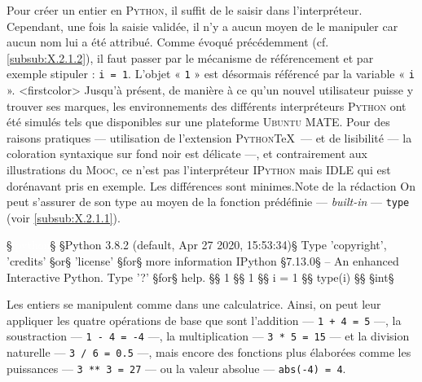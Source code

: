 

Pour créer un entier en \textsc{Python}, il suffit de le saisir dans l'interpréteur. Cependant, une fois la saisie validée, il n'y a aucun moyen de le manipuler car aucun nom lui a été attribué. Comme évoqué précédemment (cf. \cref{subsub:X.2.1.2}), il faut passer par le mécanisme de référencement et par exemple stipuler : \texttt{i = 1}. 
L'objet « \texttt{1} » est désormais référencé par la variable « \texttt{i} ».
\caution[b]<firstcolor>{%
Jusqu'à présent, de manière à ce qu'un nouvel utilisateur puisse y trouver ses marques, les environnements des différents interpréteurs \textsc{Python} ont été simulés tels que disponibles sur une plateforme \textsc{Ubuntu} MATE. Pour des raisons pratiques --- utilisation de l'extension \textsc{Python}\TeX\ --- et de lisibilité --- la coloration syntaxique sur fond noir est délicate ---, et contrairement aux illustrations du \textsc{Mooc}, ce n'est pas l'interpréteur \textsc{IPython} mais IDLE qui est dorénavant pris en exemple. Les différences sont minimes.}{Note de la rédaction}%
On peut s'assurer de son type au moyen de la fonction prédéfinie --- \textit{built-in} --- \texttt{type} (voir \cref{subsub:X.2.1.1}).

\vspace{4pt}%

\begin{ipythonminted}
§\textcolor{white}{ipython}§
§Python 3.8.2 (default, Apr 27 2020, 15:53:34)§
Type 'copyright', 'credits' §or§ 'license' §for§ more information
IPython §7.13.0§ -- An enhanced Interactive Python. Type '?' §for§ help.
§§ 1
§§ 1
§§ i = 1
§§ type(i)
§§ §int§
\end{ipythonminted}

\vspace{4pt}


Les entiers se manipulent comme dans une calculatrice. Ainsi, on peut leur appliquer les quatre opérations de base que sont l'addition --- \texttt{1 + 4 = 5} ---, la soustraction --- \texttt{1 - 4 = -4} ---, la multiplication  --- \texttt{3 * 5 = 15} --- et la division  naturelle --- \texttt{3 / 6 = 0.5} ---, mais encore des fonctions plus élaborées comme les puissances --- \texttt{3 ** 3 = 27} --- ou la valeur absolue --- \texttt{abs(-4) = 4}.

